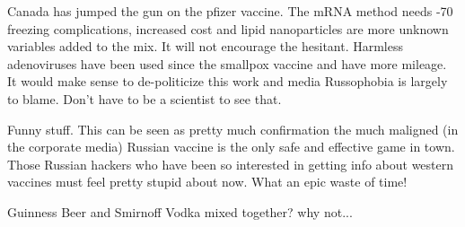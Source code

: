 \begin{itemize}


Canada has jumped the gun on the pfizer vaccine. The mRNA method needs -70
freezing complications, increased cost and lipid nanoparticles are more unknown
variables added to the mix. It will not encourage the hesitant. Harmless
adenoviruses have been used since the smallpox vaccine and have more mileage.
It would make sense to de-politicize this work and media Russophobia is largely
to blame. Don't have to be a scientist to see that. 


Funny stuff. This can be seen as pretty much confirmation the much maligned (in
the corporate media) Russian vaccine is the only safe and effective game in
town. Those Russian hackers who have been so interested in getting info about
western vaccines must feel pretty stupid about now. What an epic waste of time! 


Guinness Beer and Smirnoff Vodka mixed together? why not... 
\end{itemize}
